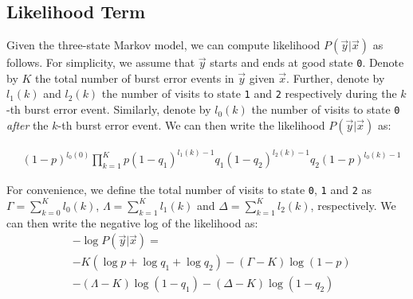 \subsection{Likelihood Term}
\label{subsec:error_likelihod}

Given the three-state Markov model, we can compute likelihood $P(\vec{y} | \vec{x})$ as follows. 
For simplicity, we assume that $\vec{y}$ starts and ends at good state \texttt{0}. 
Denote by $K$ the total number of burst error events in $\vec{y}$ given $\vec{x}$. 
Further, denote by $l_1(k)$ and $l_2(k)$ the number of visits to state \texttt{1} and \texttt{2} respectively during the $k$-th burst error event.
Similarly, denote by $l_0(k)$ the number of visits to state \texttt{0} \textit{after} the $k$-th burst error event. 
We can then write the likelihood $P(\vec{y}|\vec{x})$ as:

\vspace{-0.1in}
\begin{small}
\begin{equation}
\begin{split}
&(1-p)^{l_0(0)} \prod^{K}_{k=1} 
p(1-q_1)^{l_1(k)-1} q_1(1-q_2)^{l_2(k)-1}q_2 (1-p)^{l_0(k)-1} 
\end{split}
\label{eq:likelihood}
\end{equation}
\end{small}

\vspace{-0.15in}
For convenience, we define the total number of visits to state \texttt{0}, \texttt{1} and \texttt{2} as $\Gamma=\sum_{k=0}^{K} l_0(k)$, $\Lambda=\sum_{k=1}^K l_1(k)$ and $\Delta=\sum_{k=1}^K l_2(k)$, respectively.
We can then write the negative log of the likelihood as:
\begin{equation}
\label{eq:negaLogLikelihood}
\begin{split}
&-\log{P(\vec{y}|\vec{x})} =\\
& - K(\log{p}+\log{q_1}+\log{q_2}) -(\Gamma-K)\log{(1-p)} \\
&  - (\Lambda-K)\log{(1-q_1)} - (\Delta-K)\log{(1-q_2)}
\end{split}
\end{equation}

